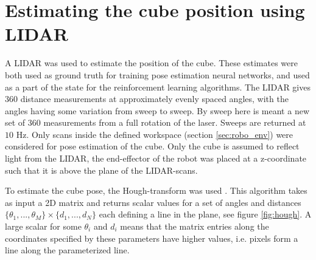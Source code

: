 \section{Estimating the cube position using LIDAR}
\label{sec:method_hough}

A LIDAR was used to estimate the position of the cube. These estimates were
both used as ground truth for training pose estimation neural networks, and
used as a part of the state for the reinforcement learning algorithms. The
LIDAR gives $360$ distance measurements at approximately evenly spaced angles,
with the angles having some variation from sweep to sweep. By sweep here is
meant a new set of 360 measurements from a full rotation of the laser. Sweeps
are returned at $10$ Hz. Only scans inside the defined workspace (section
\ref{sec:robo_env}) were considered for pose estimation of the cube. Only the
cube is assumed to reflect light from the LIDAR, the end-effector of the robot
was placed at a z-coordinate such that it is above the plane of the
LIDAR-scans.

To estimate the cube pose, the Hough-transform was used \cite{duda1972use}.
This algorithm takes as input a 2D matrix and returns scalar values for a set
of angles and distances $\lbrace \theta_1, ..., \theta_M\rbrace \times \lbrace
d_1, ..., d_N \rbrace$ each defining a line in the plane, see figure
\ref{fig:hough}. A large scalar for some $\theta_i$ and $d_i$ means that the
matrix entries along the coordinates specified by these parameters have higher
values, i.e. pixels form a line along the parameterized line.

